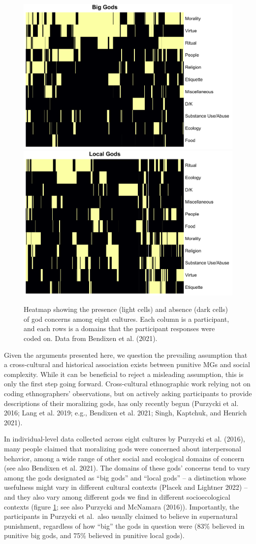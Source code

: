 \documentclass[
]{article}
\begin{document}
\begin{figure}
\includegraphics[width=0.5\linewidth]{mhg-writeup_files/figure-latex/bendixenPlot-1} \includegraphics[width=0.5\linewidth]{mhg-writeup_files/figure-latex/bendixenPlot-2} \caption{Heatmap showing the presence (light cells) and absence (dark cells) of god concerns among eight cultures. Each column is a participant, and each rows is a domains that the participant responses were coded on. Data from Bendixen et al. (2021).}\label{fig:bendixenPlot}
\end{figure}

Given the arguments presented here, we question the prevailing assumption that a cross-cultural and historical association exists between punitive MGs and social complexity. While it can be beneficial to reject a misleading assumption, this is only the first step going forward. Cross-cultural ethnographic work relying not on coding ethnographers' observations, but on actively asking participants to provide descriptions of their moralizing gods, has only recently begun (Purzycki et al. 2016; Lang et al. 2019; e.g., Bendixen et al. 2021; Singh, Kaptchuk, and Henrich 2021).

In individual-level data collected across eight cultures by Purzycki et al. (2016), many people claimed that moralizing gods were concerned about interpersonal behavior, among a wide range of other social and ecological domains of concern (see also Bendixen et al. 2021). The domains of these gods' concerns tend to vary among the gods designated as ``big gods'' and ``local gods'' -- a distinction whose usefulness might vary in different cultural contexts (Placek and Lightner 2022) -- and they also vary among different gods we find in different socioecological contexts (figure \ref{fig:bendixenPlot}; see also Purzycki and McNamara (2016)). Importantly, the participants in Purzycki et al.~also usually claimed to believe in supernatural punishment, regardless of how ``big'' the gods in question were (83\% believed in punitive big gods, and 75\% believed in punitive local gods).
\end{document}
